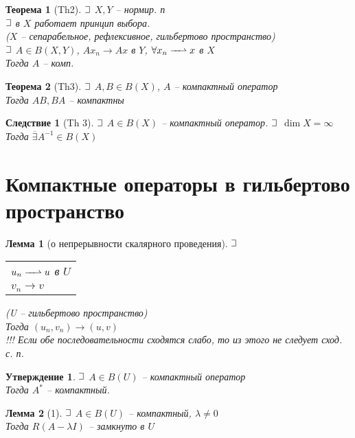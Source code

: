 \documentclass{article}
\theoremstyle{truestyle}
\newtheorem*{theorem}{Теорема}
\newtheorem*{lemma}{Лемма}
\newtheorem*{utv}{Утверждение}
\newtheorem*{sled}{Следствие}
\newcommand{\weakconv}{\xrightharpoonup{\quad\,}}
\def\letus{%
	\mathord{\setbox0=\hbox{$\exists$}%
		\hbox{\kern 0.125\wd0%
			\vbox to \ht0{%
				\hrule width 0.75\wd0%
				\vfill%
				\hrule width 0.75\wd0}%
			\vrule height \ht0%
			\kern 0.125\wd0}%
	}%
}
\begin{document}
\begin{theorem}[Th2]
  $\letus$ $X, Y$ -- нормир. п\\
  $\letus$ в $X$ работает принцип выбора. \\
  ($X$ -- сепарабельное, рефлексивное, гильбертово пространство)\\
  $\letus$ $A \in B(X, Y)$, $Ax_n \longrightarrow Ax$ в $Y$, $\forall x_n \weakconv x$ в $X$\\ 
  Тогда $A$ -- комп. 
\end{theorem}

\begin{theorem}[Th3]
  $\letus$ $A, B \in B(X)$, $A$ -- компактный оператор\\
  Тогда $AB, BA$ -- компактны
\end{theorem}

\begin{sled}[Th 3]
  $\letus$ $A\in B(X)$ -- компактный оператор. $\letus$ $\dim X = \infty$ \\
  Тогда $\overline{\exists} A^{-1} \in B(X)$
\end{sled}

\section*{Компактные операторы в гильбертово пространство}

\begin{lemma}[о непрерывности скалярного проведения]
  $\letus$ \begin{tabular}[t]{l}$u_n \weakconv u$ в $U$\\$v_n \longrightarrow v$\end{tabular} (U -- гильбертово пространство)\\
  Тогда $(u_n, v_n) \longrightarrow (u, v)$\\
  !!! Если обе последовательности сходятся слабо, то из этого не следует сход. с. п.
\end{lemma}

\begin{utv}
  $\letus$ $A \in B(U)$ -- компактный оператор\\
  Тогда $A^*$ -- компактный.
\end{utv}

\begin{lemma}[1]
  $\letus$ $A \in B(U)$ -- компактный, $\lambda \not = 0$\\
  Тогда $R(A - \lambda I)$ -- замкнуто в $U$
\end{lemma}
\end{document}
